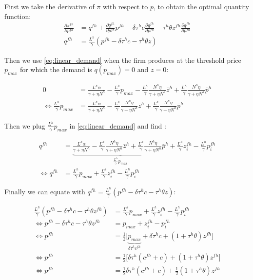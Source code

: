 First we take the derivative of $\pi$ with respect to $p$, to obtain the optimal quantity function:
\begin{align*}
    \frac{\partial \pi^{fh}}{\partial p^{fh}} & = q^{fh} + \frac{\partial q^{fh}}{\partial p^{fh}} p^{fh} - \delta \tau^h c\frac{\partial q^{fh}}{\partial p^{fh}} - \tau^h\theta z^{fh} \frac{\partial q^{fh}}{\partial p^{fh}} \\
    q^{fh} &= \frac{L^h}{\gamma} \left(p^{fh} - \delta \tau^h c - \tau^h\theta z \right)
\end{align*}

Then we use \eqref{eq:linear_demand} when the firm produces at the threshold price $p_{max}$ for which the demand is $q(p_{max}) = 0$ and $z = 0$: 

\begin{align*}
    0 &= \frac{L^h \alpha}{\gamma + \eta N^h} - \frac{L^h}{\gamma} p_{max} - \frac{L^h}{\gamma}\frac{N^h \eta}{\gamma + \eta N^h}\bar{z}^h + \frac{L^h}{\gamma} \frac{ N^h \eta}{\gamma + \eta N^h} \bar{p}^h \\
    \Longleftrightarrow \frac{L^h}{\gamma} p_{max} &= \frac{L^h \alpha}{\gamma + \eta N^h} - \frac{L^h}{\gamma} \frac{N^h \eta}{\gamma + \eta N^h}\bar{z}^h + \frac{L^h}{\gamma} \frac{N^h \eta}{\gamma + \eta N^h} \bar{p}^h
\end{align*}

Then we plug $\frac{L^h}{\gamma} p_{max}$ in \eqref{eq:linear_demand} and find : 

\begin{align*}
    q^{fh} &= \underbrace{\frac{L^h \alpha}{\gamma + \eta N^h} - \frac{L^h}{\gamma} \frac{N^h \eta}{\gamma + \eta N^h}\bar{z}^h + \frac{L^h}{\gamma} \frac{N^h \eta}{\gamma + \eta N^h} \bar{p}^h}_{\frac{L^h}{\gamma} p_{max}} +\frac{L^h}{\gamma} z_i^{fh} - \frac{L^h}{\gamma} p_i^{fh} \\
    \Longleftrightarrow q^{fh} &= \frac{L^h}{\gamma} p_{max} + \frac{L^h}{\gamma} z_i^{fh} - \frac{L^h}{\gamma} p_i^{fh}
\end{align*}

Finally we can equate with $q^{fh} = \frac{L^h}{\gamma} \left(p^{fh} - \delta \tau^h c - \tau^h\theta z \right)$: 

\begin{align*}
     \frac{L^h}{\gamma} \left(p^{fh} - \delta \tau^h c - \tau^h\theta z^{fh} \right) &= \frac{L^h}{\gamma} p_{max} + \frac{L^h}{\gamma} z_i^{fh} - \frac{L^h}{\gamma} p_i^{fh} \\
     \Longleftrightarrow  p^{fh} - \delta \tau^h c - \tau^h\theta z^{fh} &= p_{max} + z_i^{fh} - p_i^{fh} \\
     \Longleftrightarrow p^{fh} &= \frac{1}{2}\big[ \underbrace{p_{max}}_{\delta \tau^h c^{fh}}  + \delta \tau^hc + (1 + \tau^h\theta) z^{fh} \big] \\
     \Longleftrightarrow p^{fh} &= \frac{1}{2}\big[ \delta \tau^h ( c^{fh} +  c) + (1 + \tau^h\theta) z^{fh} \big] \\
     \Longleftrightarrow p^{fh} &= \frac{1}{2}\delta \tau^h ( c^{fh} +  c) + \frac{1}{2} (1 + \tau^h\theta) z^{fh}
\end{align*}

